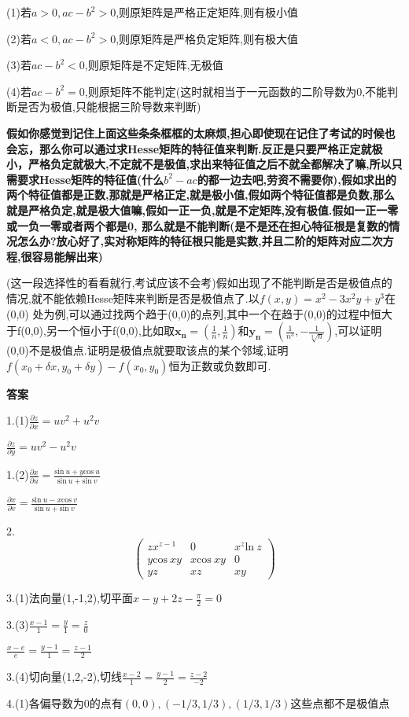 \documentclass{ctexart}
\begin{document}
(1)若$a>0,ac-b^{2}>0$,则原矩阵是严格正定矩阵,则有极小值

(2)若$a<0,ac-b^{2}>0$,则原矩阵是严格负定矩阵,则有极大值

(3)若$ac-b^{2}<0$,则原矩阵是不定矩阵,无极值

(4)若$ac-b^{2}=0$,则原矩阵不能判定(这时就相当于一元函数的二阶导数为0,不能判断是否为极值,只能根据三阶导数来判断)

\textbf{假如你感觉到记住上面这些条条框框的太麻烦,担心即使现在记住了考试的时候也会忘，那么你可以通过求Hesse矩阵的特征值来判断.反正是只要严格正定就极小，严格负定就极大,不定就不是极值,求出来特征值之后不就全都解决了嘛,所以只需要求Hesse矩阵的特征值(什么}$b^{2}-ac$\textbf{的都一边去吧,劳资不需要你),假如求出的两个特征值都是正数,那就是严格正定,就是极小值,假如两个特征值都是负数,那么就是严格负定,就是极大值嘛,假如一正一负,就是不定矩阵,没有极值.假如一正一零或一负一零或者两个都是0, 那么就是不能判断(是不是还在担心特征根是复数的情况怎么办?放心好了,实对称矩阵的特征根只能是实数,并且二阶的矩阵对应二次方程,很容易能解出来)}

(这一段选择性的看看就行,考试应该不会考)假如出现了不能判断是否是极值点的情况,就不能依赖Hesse矩阵来判断是否是极值点了.以$f(x,y)=x^{2}-3x^{2}y+y^{3}$在(0,0) 处为例,可以通过找两个趋于(0,0)的点列,其中一个在趋于(0,0)的过程中恒大于f(0,0),另一个恒小于f(0,0),比如取$\mathbf{x_{n}}=(\frac{1}{n},\frac{1}{n})$和$\mathbf{y_{n}}=(\frac{1}{n^{3}},-\frac{1}{\sqrt[3]{n}})$,可以证明(0,0)不是极值点.证明是极值点就要取该点的某个邻域,证明$f(x_{0}+\delta x,y_{0}+\delta y)-f(x_{0},y_{0})$恒为正数或负数即可.


\newpage
\textbf{答案}

1.(1)$\frac{\partial z}{\partial x}=uv^{2}+u^{2}v$

$\frac{\partial z}{\partial y}=uv^{2}-u^{2}v$


1.(2)$\frac{\partial x}{\partial u}=\frac{\mathrm{sin}\ u+y\mathrm{cos}\ u}{\mathrm{sin}\ u+\mathrm{sin}\ v}$

$\frac{\partial x}{\partial v}=\frac{\mathrm{sin}\ u-x\mathrm{cos}\ v}{\mathrm{sin}\ u+\mathrm{sin}\ v}$

2.\begin{equation}\nonumber
{
\left( \begin{array}{ccc}
zx^{z-1} & 0 & x^{z}\mathrm{ln}\ z\\
y\mathrm{cos}\ xy & x\mathrm{cos}\ xy & 0\\
yz & xz & xy
\end{array}
\right )}
\end{equation}

3.(1)法向量(1,-1,2),切平面$x-y+2z-\frac{\pi}{2}=0$

3.(3)$\frac{x-1}{1}=\frac{y}{1}=\frac{z}{0}$

$\frac{x-e}{e}=\frac{y-1}{1}=\frac{z-1}{2}$

3.(4)切向量(1,2,-2),切线$\frac{x-2}{1}=\frac{y-1}{2}=\frac{z-2}{-2}$

4.(1)各偏导数为0的点有$(0,0),(-1/3,1/3),(1/3,1/3)$这些点都不是极值点
\end{document}
